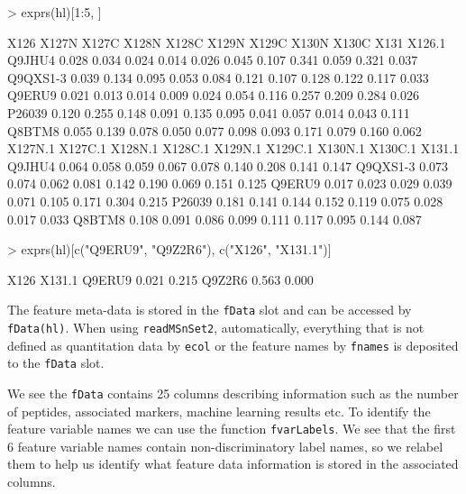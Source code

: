 \begin{Schunk}
\begin{Sinput}
> exprs(hl)[1:5, ]
\end{Sinput}
\begin{Soutput}
          X126 X127N X127C X128N X128C X129N X129C X130N X130C  X131 X126.1
Q9JHU4   0.028 0.034 0.024 0.014 0.026 0.045 0.107 0.341 0.059 0.321  0.037
Q9QXS1-3 0.039 0.134 0.095 0.053 0.084 0.121 0.107 0.128 0.122 0.117  0.033
Q9ERU9   0.021 0.013 0.014 0.009 0.024 0.054 0.116 0.257 0.209 0.284  0.026
P26039   0.120 0.255 0.148 0.091 0.135 0.095 0.041 0.057 0.014 0.043  0.111
Q8BTM8   0.055 0.139 0.078 0.050 0.077 0.098 0.093 0.171 0.079 0.160  0.062
         X127N.1 X127C.1 X128N.1 X128C.1 X129N.1 X129C.1 X130N.1 X130C.1 X131.1
Q9JHU4     0.064   0.058   0.059   0.067   0.078   0.140   0.208   0.141  0.147
Q9QXS1-3   0.073   0.074   0.062   0.081   0.142   0.190   0.069   0.151  0.125
Q9ERU9     0.017   0.023   0.029   0.039   0.071   0.105   0.171   0.304  0.215
P26039     0.181   0.141   0.144   0.152   0.119   0.075   0.028   0.017  0.033
Q8BTM8     0.108   0.091   0.086   0.099   0.111   0.117   0.095   0.144  0.087
\end{Soutput}
\begin{Sinput}
> exprs(hl)[c("Q9ERU9", "Q9Z2R6"), c("X126", "X131.1")]
\end{Sinput}
\begin{Soutput}
        X126 X131.1
Q9ERU9 0.021  0.215
Q9Z2R6 0.563  0.000
\end{Soutput}
\end{Schunk}

The feature meta-data is stored in the \texttt{fData} slot and can be
accessed by \texttt{fData(hl)}. When using \texttt{readMSnSet2}, automatically,
everything that is not defined as quantitation data by \texttt{ecol} or the
feature names by \texttt{fnames} is deposited to the \texttt{fData} slot. 

We see the \texttt{fData} contains 25 columns describing information such as
the number of peptides, associated markers, machine learning results
etc. To identify the feature variable names we can use the function
\texttt{fvarLabels}. We see that the first 6 feature variable names contain
non-discriminatory label names, so we relabel them to help us identify
what feature data information is stored in the associated columns.

